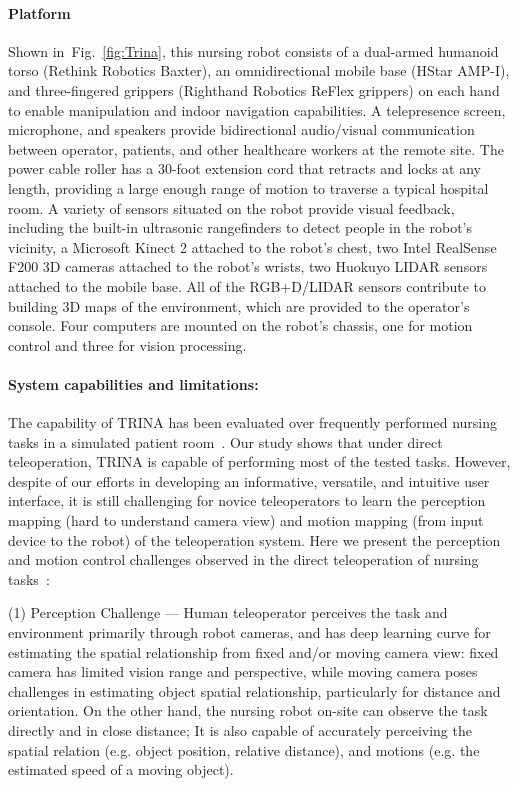 \documentclass[letterpaper, 11 pt, onecolumn]{article}
\newcommand{\jie}[1]{\textcolor{green}{JF: #1}}
\newcommand{\fig}[1]{Fig.~\ref{#1}}
\begin{document}
\paragraph*{Platform} Shown in~\fig{fig:Trina}, this nursing robot consists of a dual-armed humanoid torso (Rethink Robotics Baxter), an omnidirectional mobile base (HStar AMP-I), and three-fingered grippers (Righthand Robotics ReFlex grippers) on each hand to enable manipulation and indoor navigation capabilities.  A telepresence screen, microphone, and speakers provide bidirectional audio/visual communication between operator, patients, and other healthcare workers at the remote site. The power cable roller has a 30-foot extension cord that retracts and locks at any length, providing a large enough range of motion to traverse a typical hospital room.   A variety of sensors situated on the robot provide visual feedback, including the built-in ultrasonic rangefinders to detect people in the robot's vicinity, a Microsoft Kinect 2 attached to the robot's chest, two Intel RealSense F200 3D cameras attached to the robot's wrists, two Huokuyo LIDAR sensors attached to the mobile base. All of the RGB+D/LIDAR sensors contribute to building 3D maps of the environment, which are provided to the operator's console. Four computers are mounted on the robot's chassis, one for motion control and three for vision processing. 


\paragraph*{System capabilities and limitations:} The capability of TRINA has been evaluated over frequently performed nursing tasks in a simulated patient room~\cite{Hauser_Li_BiTelepresence:17}. Our study shows that under direct teleoperation, TRINA is capable of performing most of the tested tasks. However, despite of our efforts in developing an informative, versatile, and intuitive user interface, it is still challenging for novice teleoperators to learn the perception mapping (hard to understand camera view) and motion mapping (from input device to the robot) of the teleoperation system. Here we present the perception and motion control challenges observed in the direct teleoperation of nursing tasks~\cite{li2017development}: 

\noindent
(1) Perception Challenge --- Human teleoperator perceives the task and environment primarily through robot cameras, and has deep learning curve for estimating the spatial relationship from fixed and/or moving camera view: fixed camera has limited vision range and perspective, while moving camera poses challenges in estimating object spatial relationship, particularly for distance and orientation. On the other hand, the nursing robot on-site can observe the task directly and in close distance; It is also capable of accurately perceiving the spatial relation (e.g. object position, relative distance), and motions (e.g. the estimated speed of a moving object).
\end{document}

